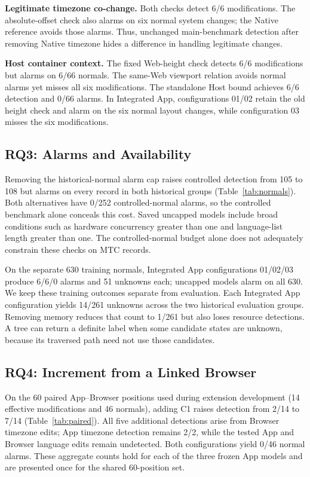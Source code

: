 \textbf{Legitimate timezone co-change.} Both checks detect 6/6 modifications. The absolute-offset check also alarms on six normal system changes; the Native reference avoids those alarms. Thus, unchanged main-benchmark detection after removing Native timezone hides a difference in handling legitimate changes.

\textbf{Host container context.} The fixed Web-height check detects 6/6 modifications but alarms on 6/66 normals. The same-Web viewport relation avoids normal alarms yet misses all six modifications. The standalone Host bound achieves 6/6 detection and 0/66 alarms. In Integrated App, configurations 01/02 retain the old height check and alarm on the six normal layout changes, while configuration 03 misses the six modifications.

\hypertarget{sec:5-3}{%
\subsection{RQ3: Alarms and Availability}\label{sec:5-3}}

Removing the historical-normal alarm cap raises controlled detection from 105 to 108 but alarms on every record in both historical groups (Table~\ref{tab:normals}). Both alternatives have 0/252 controlled-normal alarms, so the controlled benchmark alone conceals this cost. Saved uncapped models include broad conditions such as hardware concurrency greater than one and language-list length greater than one. The controlled-normal budget alone does not adequately constrain these checks on MTC records.

On the separate 630 training normals, Integrated App configurations 01/02/03 produce 6/6/0 alarms and 51 unknowns each; uncapped models alarm on all 630. We keep these training outcomes separate from evaluation. Each Integrated App configuration yields 14/261 unknowns across the two historical evaluation groups. Removing memory reduces that count to 1/261 but also loses resource detections. A tree can return a definite label when some candidate states are unknown, because its traversed path need not use those candidates.

\hypertarget{sec:5-4}{%
\subsection{RQ4: Increment from a Linked Browser}\label{sec:5-4}}

On the 60 paired App--Browser positions used during extension development (14 effective modifications and 46 normals), adding C1 raises detection from 2/14 to 7/14 (Table~\ref{tab:paired}). All five additional detections arise from Browser timezone edits; App timezone detection remains 2/2, while the tested App and Browser language edits remain undetected. Both configurations yield 0/46 normal alarms. These aggregate counts hold for each of the three frozen App models and are presented once for the shared 60-position set.

